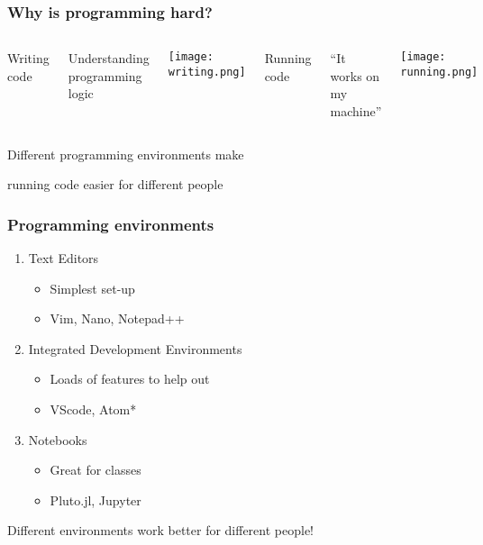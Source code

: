 \documentclass[aspectratio=169]{beamer}
\begin{document}
\begin{frame}
\frametitle{Why is programming hard?}
\begin{columns}

\pause
{}
\center \Huge{Writing code}

\normalsize Understanding programming logic

\texttt{[image: writing.png]}

\pause
\center \Huge{Running code}

\normalsize ``It works on my machine''

\texttt{[image: running.png]}
\end{columns}

\pause
\vspace{0.25cm}
\center Different programming environments make

\center running code easier for different people

\end{frame}

\begin{frame}
\frametitle{Programming environments}
\begin{enumerate}
 \item Text Editors
\begin{itemize}
\item Simplest set-up
\item Vim, Nano, Notepad++
\end{itemize}
\item Integrated Development Environments
\begin{itemize}
\item Loads of features to help out
\item VScode, Atom*
\end{itemize}
\item Notebooks
\begin{itemize}
\item Great for classes
\item Pluto.jl, Jupyter
\end{itemize}
\end{enumerate}
\end{frame}

\begin{frame}
\center \Huge{Different environments work better for different people!}
\end{frame}
\end{document}
